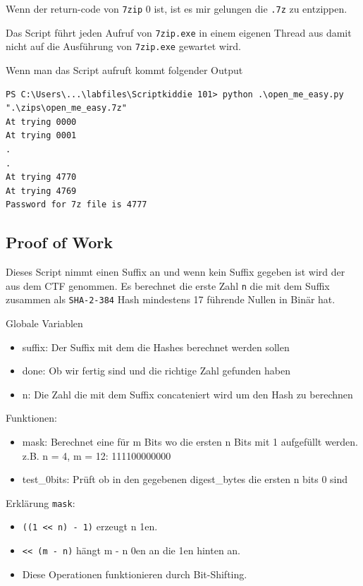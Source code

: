 \documentclass[12pt,a4paper,titlepage,oneside]{scrartcl}
\begin{document}
Wenn der return-code von \lstinline{7zip} 0 ist, ist es mir gelungen die \lstinline{.7z} zu entzippen.

Das Script führt jeden Aufruf von \lstinline{7zip.exe} in einem eigenen Thread aus damit nicht auf die Ausführung von \lstinline{7zip.exe} gewartet wird.

Wenn man das Script aufruft kommt folgender Output
\begin{lstlisting}
PS C:\Users\...\labfiles\Scriptkiddie 101> python .\open_me_easy.py ".\zips\open_me_easy.7z"
At trying 0000
At trying 0001
.
.
At trying 4770
At trying 4769
Password for 7z file is 4777 
\end{lstlisting}

\pagebreak
\subsection{Proof of Work}


Dieses Script nimmt einen Suffix an und wenn kein Suffix gegeben ist wird der aus dem CTF genommen. Es berechnet die erste Zahl \lstinline{n} die mit dem Suffix zusammen als \lstinline{SHA-2-384} Hash mindestens 17 führende Nullen in Binär hat.

Globale Variablen
\begin{itemize}
    \item suffix: Der Suffix mit dem die Hashes berechnet werden sollen
    \item done: Ob wir fertig sind und die richtige Zahl gefunden haben
    \item n: Die Zahl die mit dem Suffix concateniert wird um den Hash zu berechnen
\end{itemize}

Funktionen:
\begin{itemize}
    \item mask: Berechnet eine für m Bits wo die ersten n Bits mit 1 aufgefüllt werden. z.B. n = 4, m = 12: 111100000000
    \item test\_0bits: Prüft ob in den gegebenen digest\_bytes die ersten n bits 0 sind
\end{itemize}

Erklärung \lstinline{mask}:
\begin{itemize}
    \item \lstinline{((1 << n) - 1)} erzeugt n 1en.
    \item \lstinline{<< (m - n)} hängt m - n 0en an die 1en hinten an.
    \item Diese Operationen funktionieren durch Bit-Shifting.
\end{itemize}
\end{document}
